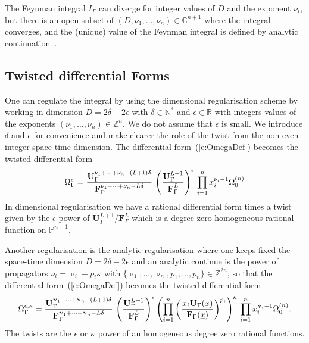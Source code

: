 \documentclass[a4paper,12pt]{article}
\numberwithin{equation}{section}
\numberwithin{figure}{section}
\begin{document}
The Feynman integral $I_\Gamma$ can diverge  for integer values of $D$ and 
the exponent $\nu_i$, but there is an open subset of
$(D,\nu_1,\dots,\nu_n)\in\mathbb C^{n+1}$ where  the integral
converges,  and the (unique) value of the Feynman integral is  defined by analytic continuation~\cite{Speer}.
\subsection{Twisted differential Forms}\label{sec:Twisted}

 One can regulate the integral by using the dimensional regularisation
scheme by working  in dimension $D=2\delta-2\epsilon$ with $\delta\in\mathbb N^*$ and
$\epsilon\in\mathbb R$
with integers values of the exponents $(\nu_1,\dots,\nu_n)\in\mathbb
Z^n$.
 We do not assume that $\epsilon$ is
	small. We introduce $\delta$ and $\epsilon$ for convenience and make
	clearer the role of the twist from the non even integer space-time dimension.
The differential form~(\ref{e:OmegaDef}) becomes the twisted
      differential form
\begin{equation}\label{e:OmegaTwistDimReg}
  \Omega^\epsilon_\Gamma = { \textbf{U}_\Gamma ^{\nu_1+\cdots+\nu_n-(L+1)\delta}  \over \textbf{F}_\Gamma ^{\nu_1+\cdots+\nu_n-L\delta} }\,
  \left(\textbf{U}_\Gamma^{L+1}\over \textbf{F}_\Gamma^{L}\right)^{\epsilon} \, \prod_{i=1}^n x_i^{\nu_i-1} \Omega^{(n)}_0
\end{equation}
%
In dimensional regularisation we have a rational differential form
times a twist given by the $\epsilon$-power of
$\textbf{U}_\Gamma^{L+1}/\textbf{F}_\Gamma^L$ which is  a degree zero homogeneous rational function on $\mathbb
P^{n-1}$.


 Another regularisation is the
analytic regularisation where one keeps fixed the space-time dimension
$D=2\delta-2\epsilon$ and an analytic continue is the power of propagators $\nu_i=\upnu_i
+ p_i \kappa$ with $\{\upnu_1,\dots,\upnu_n,p_1,\dots,p_n\}\in\mathbb Z^{2n}$, so that the 
differential form~(\ref{e:OmegaDef}) becomes the twisted
      differential form
\begin{equation}\label{e:OmegaTwistAnaReg}
  \Omega^{\epsilon,\kappa}_\Gamma = { \textbf{U}_\Gamma
    ^{\upnu_1+\cdots+\upnu_n-(L+1)\delta}  \over \textbf{F}_\Gamma
    ^{\upnu_1+\cdots+\upnu_n-L\delta}
  }\,\left(\textbf{U}_\Gamma^{L+1}\over \textbf{F}_\Gamma^L\right)^\epsilon
  \left(\prod_{i=1}^n \left(x_i \textbf{U}_\Gamma(\underline x)\over
      \textbf{F}_\Gamma(\underline x)\right)^{p_i}\right)^{\kappa} \, \prod_{i=1}^n x_i^{\upnu_i-1} \Omega^{(n)}_0.
\end{equation}
%
The twists are the $\epsilon$ or $\kappa$ power of an homogeneous degree zero rational functions.
\end{document}
